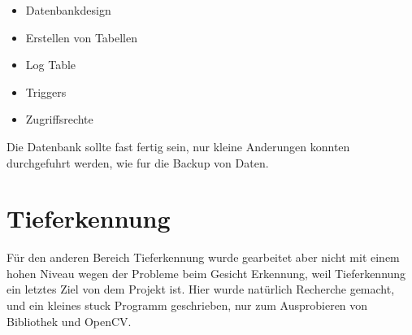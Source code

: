 \begin{itemize}
	\item Datenbankdesign
	\item Erstellen von Tabellen
	\item Log Table
	\item Triggers
	\item Zugriffsrechte
\end{itemize}
Die Datenbank sollte fast fertig sein, nur kleine Anderungen konnten durchgefuhrt werden, wie fur die Backup von Daten.
\section{Tieferkennung}
Für den anderen Bereich Tieferkennung wurde gearbeitet aber nicht mit einem hohen Niveau wegen der Probleme beim Gesicht Erkennung, weil Tieferkennung ein letztes Ziel von dem Projekt ist. Hier wurde natürlich Recherche gemacht, und ein kleines stuck Programm geschrieben, nur zum Ausprobieren von Bibliothek und OpenCV.

